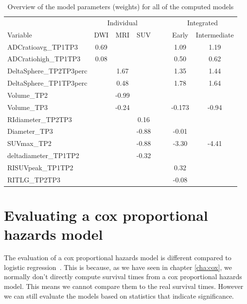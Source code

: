 \begin{table}
	\centering
	\begin{tabular}{lccccccc} 
		\toprule
		\multicolumn{1}{c}{}& \multicolumn{3}{c}{Individual} & \multicolumn{2}{c}{}&  \multicolumn{2}{c}{Integrated}\\ 
		\cmidrule{2-8}
		Variable & DWI    & MRI & SUV & & & Early    & Intermediate\\ 
		\midrule
		ADCratioavg\_TP1TP3 		& 0.69	& 		&  		& & & 1.09		& 1.19	\\ 
		ADCratiohigh\_TP1TP3 		& 0.08	&      	&  		& & & 0.50		& 0.62	\\ [10pt]
		DeltaSphere\_TP2TP3perc 	&      	& 1.67  &  		& & & 1.35		& 1.44  \\
		DeltaSphere\_TP1TP3perc 	&      	& 0.48  &  		& & & 1.78		& 1.64  \\
		Volume\_TP2 				&  		& -0.99 &   	& & & 			& 		\\
		Volume\_TP3 				&  		& -0.24 &   	& & & -0.173	& -0.94	\\ [10pt]
		RIdiameter\_TP2TP3 			&  		&      	& 0.16  & & & 			& 		\\
		Diameter\_TP3 				&  		&      	& -0.88 & & & -0.01		& 		\\
		SUVmax\_TP2 				&  		&      	& -0.88 & & & -3.30		& -4.41	\\
		deltadiameter\_TP1TP2 		&  		&      	& -0.32 & & & 			& 		\\
		RISUVpeak\_TP1TP2 			&  		&      	&  		& & & 0.32		& 		\\
		RITLG\_TP2TP3 				&  		&      	&  		& & & -0.08		& 		\\
		\bottomrule
	\end{tabular}
	\caption{Overview of the model parameters (weights) for all of the computed models}
	\label{tab:evaluation-model-parameters}
\end{table}

\section{Evaluating a cox proportional hazards model}
\label{sec:evaluation-coxph}
The evaluation of a cox proportional hazards model is different compared to logistic regression~\cite{newson2010comparing}\cite{harrell1996tutorial}. This is because, as we have seen in chapter \ref{cha:cox}, we normally don't directly compute survival times from a cox proportional hazards model. This means we cannot compare them to the real survival times. However we can still evaluate the models based on statistics that indicate significance.

